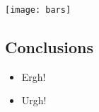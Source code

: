 \documentclass[final, finnished, monochromatic]{jyuposter}
\begin{document}
\begin{multicols}

\bigskip
\noindent
\texttt{[image: bars]}

\bigskip
\noindent
\begin{tcolorbox}
\section*{Conclusions}

\begin{itemize}
  \item Ergh!
  \item Urgh!
\end{itemize}
\end{tcolorbox}

\nocite{*}

\printbibliography

\end{multicols}
\end{document}

